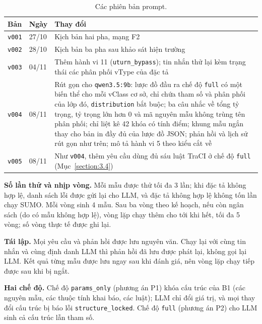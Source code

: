 \documentclass[../main.tex]{subfiles}
\begin{document}
\begin{table}[ht]
\centering
\small
\caption{Các phiên bản prompt.}
\label{table:3.prompts}
\begin{tabular}{|p{1.4cm}|p{1.6cm}|p{10.6cm}|}
\hline
\textbf{Bản} & \textbf{Ngày} & \textbf{Thay đổi} \\ \hline
\texttt{v001} & 27/10 & Kịch bản hai pha, mạng F2 \\ \hline
\texttt{v002} & 28/10 & Kịch bản ba pha sau khảo sát hiện trường \\ \hline
\texttt{v003} & 04/11 & Thêm hành vi 11 (\texttt{uturn\_bypass}); tin nhắn thử lại kèm trạng thái các phân phối vType của đặc tả \\ \hline
\texttt{v004} & 08/11 & Rút gọn cho \texttt{qwen3.5:9b}: lược đồ đầu ra chế độ \texttt{full} có một biến thể cho mỗi vClass cơ sở, chỉ chứa tham số và phân phối của lớp đó, \texttt{distribution} bắt buộc; ba câu nhắc về tổng tỷ trọng, tỷ trọng lớn hơn 0 và mã nguyên mẫu không trùng tên phân phối; chỉ liệt kê 42 khóa có tính điểm; khung mẫu ngắn thay cho bản in đầy đủ của lược đồ JSON; phản hồi và lịch sử rút gọn như trên; mô tả hành vi 5 theo kiểu cắt về \\ \hline
\texttt{v005} & 08/11 & Như \texttt{v004}, thêm yêu cầu dùng đủ sáu luật TraCI ở chế độ \texttt{full} (Mục~\ref{section:3.4}) \\ \hline
\end{tabular}
\end{table}

\textbf{Số lần thử và nhịp vòng.} Mỗi mẫu được thử tối đa 3 lần; khi đặc tả không hợp lệ, danh sách lỗi được gửi lại cho LLM, và đặc tả không hợp lệ không tốn lần chạy SUMO. Mỗi vòng sinh 4 mẫu. Sau ba vòng theo kế hoạch, nếu còn ngân sách (do có mẫu không hợp lệ), vòng lặp chạy thêm cho tới khi hết, tối đa 5 vòng; số vòng thực tế được ghi lại.

\textbf{Tái lập.} Mọi yêu cầu và phản hồi được lưu nguyên văn. Chạy lại với cùng tin nhắn và cùng định danh LLM thì phản hồi đã lưu được phát lại, không gọi lại LLM. Kết quả từng mẫu được lưu ngay sau khi đánh giá, nên vòng lặp chạy tiếp được sau khi bị ngắt.

\textbf{Hai chế độ.} Chế độ \texttt{params\_only} (phương án P1) khóa cấu trúc của B1 (các nguyên mẫu, các thuộc tính khai báo, các luật); LLM chỉ đổi giá trị, và mọi thay đổi cấu trúc bị báo lỗi \texttt{structure\_locked}. Chế độ \texttt{full} (phương án P2) cho LLM sinh cả cấu trúc lẫn tham số.
\end{document}
